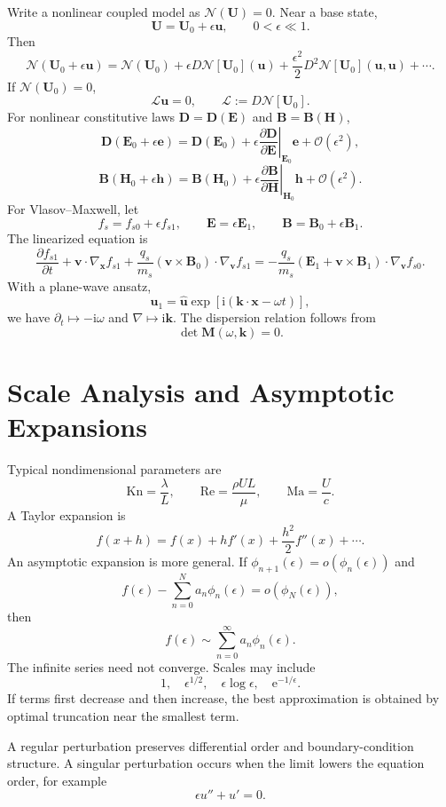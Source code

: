 \documentclass[11pt,openany]{book}
\newcommand{\ee}{\mathrm e}
\newcommand{\ii}{\mathrm i}
\newcommand{\Order}{\mathcal O}
\newcommand{\Lop}{\mathcal L}
\newcommand{\Nop}{\mathcal N}
\begin{document}
Write a nonlinear coupled model as $\Nop(\bm U)=0$. Near a base state,
\[
\bm U=\bm U_0+\epsilon\bm u,\qquad 0<\epsilon\ll1.
\]
Then
\[
\Nop(\bm U_0+\epsilon\bm u)=\Nop(\bm U_0)+\epsilon D\Nop[\bm U_0](\bm u)+\frac{\epsilon^2}{2}D^2\Nop[\bm U_0](\bm u,\bm u)+\cdots.
\]
If $\Nop(\bm U_0)=0$,
\[
\Lop\bm u=0,\qquad \Lop:=D\Nop[\bm U_0].
\]
For nonlinear constitutive laws $\bm D=\bm D(\bm E)$ and $\bm B=\bm B(\bm H)$,
\[
\bm D(\bm E_0+\epsilon\bm e)=\bm D(\bm E_0)+\epsilon\left.\frac{\partial\bm D}{\partial\bm E}\right|_{\bm E_0}\bm e+\Order(\epsilon^2),
\]
\[
\bm B(\bm H_0+\epsilon\bm h)=\bm B(\bm H_0)+\epsilon\left.\frac{\partial\bm B}{\partial\bm H}\right|_{\bm H_0}\bm h+\Order(\epsilon^2).
\]
For Vlasov--Maxwell, let
\[
f_s=f_{s0}+\epsilon f_{s1},\qquad \bm E=\epsilon\bm E_1,\qquad \bm B=\bm B_0+\epsilon\bm B_1.
\]
The linearized equation is
\[
\frac{\partial f_{s1}}{\partial t}+\bm v\cdot\nabla_{\bm x}f_{s1}+\frac{q_s}{m_s}(\bm v\times\bm B_0)\cdot\nabla_{\bm v}f_{s1}
=-\frac{q_s}{m_s}(\bm E_1+\bm v\times\bm B_1)\cdot\nabla_{\bm v}f_{s0}.
\]
With a plane-wave ansatz,
\[
\bm u_1=\widehat{\bm u}\exp[\ii(\bm k\cdot\bm x-\omega t)],
\]
we have $\partial_t\mapsto-\ii\omega$ and $\nabla\mapsto\ii\bm k$. The dispersion relation follows from
\[
\det\bm M(\omega,\bm k)=0.
\]

\chapter*{Scale Analysis and Asymptotic Expansions}
Typical nondimensional parameters are
\[
\mathrm{Kn}=\frac{\lambda}{L},\qquad \mathrm{Re}=\frac{\rho UL}{\mu},\qquad \mathrm{Ma}=\frac{U}{c}.
\]
A Taylor expansion is
\[
f(x+h)=f(x)+hf'(x)+\frac{h^2}{2}f''(x)+\cdots.
\]
An asymptotic expansion is more general. If $\phi_{n+1}(\epsilon)=o(\phi_n(\epsilon))$ and
\[
f(\epsilon)-\sum_{n=0}^{N}a_n\phi_n(\epsilon)=o(\phi_N(\epsilon)),
\]
then
\[
f(\epsilon)\sim\sum_{n=0}^{\infty}a_n\phi_n(\epsilon).
\]
The infinite series need not converge. Scales may include
\[
1,\quad \epsilon^{1/2},\quad \epsilon\log\epsilon,\quad \ee^{-1/\epsilon}.
\]
If terms first decrease and then increase, the best approximation is obtained by optimal truncation near the smallest term.

A regular perturbation preserves differential order and boundary-condition structure. A singular perturbation occurs when the limit lowers the equation order, for example
\[
\epsilon u''+u'=0.
\]
\end{document}
